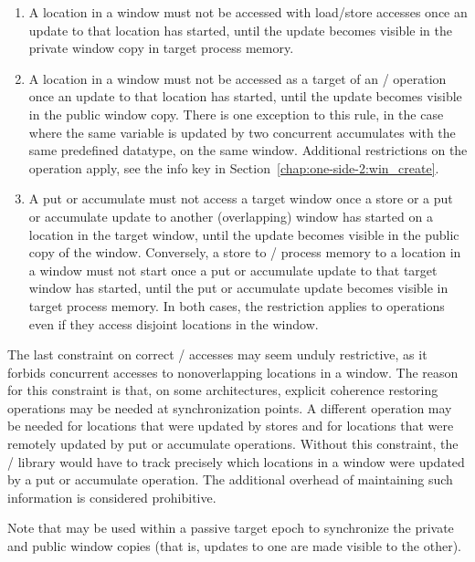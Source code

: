 \begin{enumerate}
\def\makelabel#1{\hss\llap{S#1}}%
\item\label{rule:s1}
A location in a window must not be accessed
with load/store accesses once an update to
that location has started, until the update becomes visible in the
private window copy in target process
memory.
\item\label{rule:s2}
A location in a window must not  be accessed as a target of an \RMA/
operation once an update to that location has started, until the
update becomes visible in the public window copy. There is one
exception to this rule, in the case where the same variable is updated
by two concurrent accumulates with the same
predefined datatype, on the same window. Additional restrictions on the
operation apply, see the info key  in
Section~\ref{chap:one-side-2:win_create}.
\item\label{rule:s3}
A put or accumulate must not access a target window once a
store %
or a put or accumulate update to another (overlapping) window
has started on a location in the target window, until the  update
becomes visible in the public copy of the  window.
Conversely, a store to \mpi/ process memory
to a location in a window must not start once a put or
accumulate update to that target window has started, until the put or accumulate
update becomes visible in target process memory.  In both cases, the
restriction applies to operations even if they access disjoint
locations in the window.
\end{enumerate}

\begin{rationale}
The last constraint on correct \RMA/ accesses may seem unduly
restrictive, as it forbids concurrent accesses to nonoverlapping
locations in a window.  The reason for this constraint is that, on
some architectures, explicit coherence restoring operations may be
needed at synchronization points.
A different operation may be needed for locations that were
updated by stores and for locations that were remotely
updated by put or accumulate operations.  Without this constraint,
the \MPI/ library would have to track
precisely which locations in a window were updated by a put or
accumulate operation.  The additional overhead of maintaining such
information is considered prohibitive.
\end{rationale}

Note that  may be used within a passive
target epoch to synchronize the private and public window copies
(that is, updates to one are made visible to the other).

